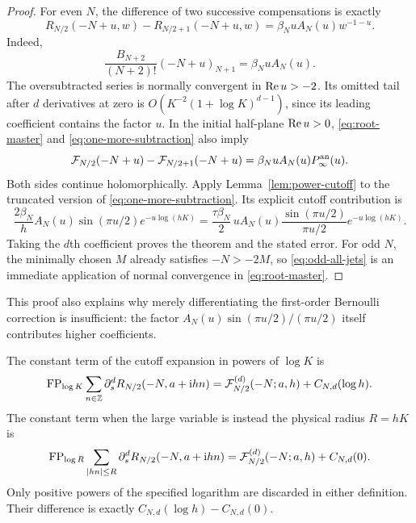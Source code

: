 \begin{proof}
For even \(N\), the difference of two successive compensations is
exactly
\begin{equation}\label{eq:one-more-subtraction}
 R_{N/2}(-N+u,w)-R_{N/2+1}(-N+u,w)
 =\beta_N uA_N(u)w^{-1-u}.
\end{equation}
Indeed,
\[
 \frac{B_{N+2}}{(N+2)!}(-N+u)_{N+1}
       =\beta_N uA_N(u).
\]
The oversubtracted series is normally convergent in
\(\operatorname{Re} u>-2\). Its omitted tail after \(d\) derivatives at zero is
\(O(K^{-2}(1+\log K)^{d-1})\), since its leading coefficient
contains the factor \(u\). In the initial half-plane \(\operatorname{Re} u>0\),
\eqref{eq:root-master} and \eqref{eq:one-more-subtraction} also imply
\[
 {\cal F}_{N/2}(-N+u)-{\cal F}_{N/2+1}(-N+u)
       =\beta_NuA_N(u)P_\infty^{\mathrm{an}}(u).
\]
Both sides continue holomorphically. Apply Lemma~\ref{lem:power-cutoff}
to the truncated version of \eqref{eq:one-more-subtraction}. Its
explicit cutoff contribution is
\[
 \frac{2\beta_N}{h}A_N(u)\sin(\pi u/2)e^{-u\log(hK)}
 =\frac{\tau\beta_N}{2}\,
       uA_N(u)\frac{\sin(\pi u/2)}{\pi u/2}e^{-u\log(hK)}.
\]
Taking the \(d\)th coefficient proves the theorem and the stated
error. For odd \(N\), the minimally chosen \(M\) already satisfies
\(-N>-2M\), so \eqref{eq:odd-all-jets} is an immediate application
of normal convergence in \eqref{eq:root-master}.
\end{proof}

This proof also explains why merely differentiating the first-order
Bernoulli correction is insufficient: the factor
\(A_N(u)\sin(\pi u/2)/(\pi u/2)\) itself contributes higher
coefficients.

\begin{corollary}\label{cor:cutoff-coordinate}
The constant term of the cutoff expansion in powers of \(\log K\)
is
\begin{equation}\label{eq:index-finite-part}
 \operatorname{FP}_{\log K}\sum_{n\in\mathbb Z}
     \partial_s^dR_{N/2}(-N,a+\mathrm i hn)
 ={\cal F}_{N/2}^{(d)}(-N;a,h)+C_{N,d}(\log h).
\end{equation}
The constant term when the large variable is instead the physical
radius \(R=hK\) is
\begin{equation}\label{eq:radius-finite-part}
 \operatorname{FP}_{\log R}\sum_{|hn|\leq R}
     \partial_s^dR_{N/2}(-N,a+\mathrm i hn)
 ={\cal F}_{N/2}^{(d)}(-N;a,h)+C_{N,d}(0).
\end{equation}
Only positive powers of the specified logarithm are discarded in
either definition. Their difference is exactly
\(C_{N,d}(\log h)-C_{N,d}(0)\).
\end{corollary}

